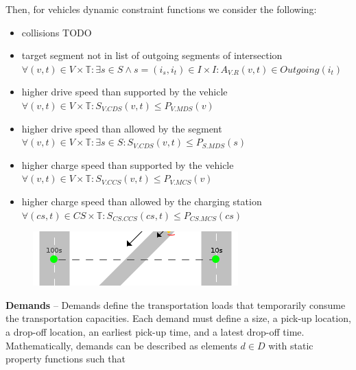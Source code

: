 \documentclass[graybox]{svmult}
\begin{document}
Then, for vehicles dynamic constraint functions we consider the following:
\begin{itemize}
	\item collisions TODO
	\item target segment not in list of outgoing segments of intersection $\forall (v,t) \in V \times \mathbb{T}: \exists s \in S \wedge s = (i_s, i_t) \in I \times I: A_{V.R}(v, t) \in Outgoing(i_t)$
	
	\item higher drive speed than supported by the vehicle $\forall (v,t) \in V \times \mathbb{T}: S_{V.CDS}(v,t) \leq P_{V.MDS}(v)$
	\item higher drive speed than allowed by the segment $\forall (v,t) \in V \times \mathbb{T}: \exists s \in S: S_{V.CDS}(v,t) \leq P_{S.MDS}(s)$
	\item higher charge speed than supported by the vehicle $\forall (v,t) \in V \times \mathbb{T}: S_{V.CCS}(v,t) \leq P_{V.MCS}(v)$
	\item higher charge speed than allowed by the charging station $\forall (cs,t) \in CS \times \mathbb{T}: S_{CS.CCS}(cs,t) \leq P_{CS.MCS}(cs)$
\end{itemize}
\vspace{2mm}

\begin{figure}
	\centering
	\includegraphics[scale=0.5]{../../concepts/demand.png}
\end{figure}

\noindent
\textbf{Demands}
--
Demands define the transportation loads that temporarily consume the transportation capacities.
Each demand must define a size, a pick-up location, a drop-off location, an earliest pick-up time, and a latest drop-off time.
Mathematically, demands can be described as elements $d \in D$ with static property functions such that
\end{document}
